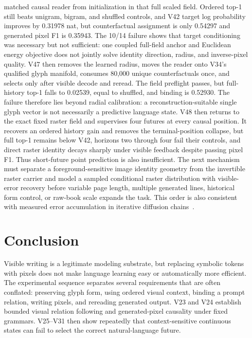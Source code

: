 \documentclass[11pt]{article}
\begin{document}
matched causal reader from initialization in that full scaled field. Ordered
top-1 still beats unigram, bigram, and shuffled controls, and V42 target log
probability improves by 0.31978 nat, but counterfactual assignment is only
0.54297 and generated pixel F1 is 0.35943. The 10/14 failure shows that target
conditioning was necessary but not sufficient: one coupled full-field anchor
and Euclidean energy objective does not jointly solve identity direction,
radius, and inverse-pixel quality. V47 then removes the learned radius, moves
the reader onto V34's qualified glyph manifold, consumes 80,000 unique
counterfactuals once, and selects only after visible decode and reread. The
field preflight passes, but full-history top-1 falls to 0.02539, equal to
shuffled, and binding is 0.52930. The failure therefore lies beyond radial
calibration: a reconstruction-suitable single glyph vector is not necessarily
a predictive language state. V48 then returns to the exact fixed raster field
and supervises four futures at every causal position. It recovers an ordered
history gain and removes the terminal-position collapse, but full top-1 remains
below V42, horizons two through four fail their controls, and direct raster
identity decays sharply under visible feedback despite passing pixel F1. Thus
short-future point prediction is also insufficient. The next mechanism must
separate a foreground-sensitive image identity geometry from the invertible
raster carrier and model a sampled conditional raster distribution with
visible-error recovery before variable page length, multiple generated lines,
historical form control, or raw-book scale expands the task.
This order is also consistent with measured error accumulation in iterative
diffusion chains~\cite{inputperturb}.

\section{Conclusion}

Visible writing is a legitimate modeling substrate, but replacing symbolic
tokens with pixels does not make language learning easy or automatically more
efficient. The experimental sequence separates several requirements that are
often conflated: preserving glyph form, using ordered visual context, binding a
prompt relation, writing pixels, and rereading generated output. V23 and V24
establish bounded visual relation following and generated-pixel causality under
fixed grammars. V25--V31 then show repeatedly that context-sensitive continuous
states can fail to select the correct natural-language future.
\end{document}
